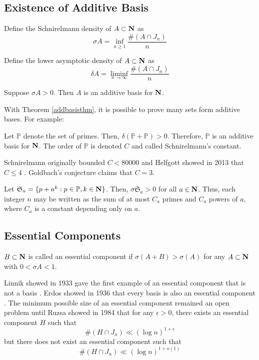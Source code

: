 \subsection{Existence of Additive Basis}

\begin{definition}
    Define the Schnirelmann density of $A\subset \mathbf{N}$ as
    $$\sigma A=\inf_{n\ge1}\frac{\#(A\cap J_n)}{n}$$
\end{definition}

\begin{definition}
    Define the lower asymptotic density of $A\subset \mathbf{N}$ as
    $$\delta A=\liminf_{n\to\infty}\frac{\#(A\cap J_n)}{n}$$
\end{definition}

\begin{theorem}
    Suppose $\sigma A>0$. Then $A$ is an additive basis for $\mathbf{N}$. \label{addbasisthm}
\end{theorem}

With Theorem \ref{addbasisthm}, it is possible to prove many sets form additive bases. For example:

\begin{theorem}
    Let $\mathbb P$ denote the set of primes. Then, $\delta(\mathbb P+\mathbb P)>0$. Therefore, $\mathbb P$ is an additive basis for $\mathbf{N}$. The order of $\mathbb P$ is denoted $C$ and called Schnirelmann's constant.
\end{theorem}

Schnirelmann originally bounded $C<80000$ and Helfgott showed in 2013 that $C\le4$ \cite{helfgott2015ternarygoldbachproblem}. Goldbach's conjecture claims that $C=3$.

\begin{theorem}
    Let $\mathfrak S_a=\{p+a^k:p\in\mathbb P, k\in\mathbf{N}\}$. Then, $\sigma\mathfrak S_a>0$ for all $a\in\mathbf{N}$. Thus, each integer $n$ may be written as the sum of at most $C_a$ primes and $C_a$ powers of $a$, where $C_a$ is a constant depending only on $a$.
\end{theorem}


\subsection{Essential Components}

\begin{definition}
    $B\subset \mathbf{N}$ is called an essential component if $\sigma(A+B)>\sigma(A)$ for any $A\subset\mathbf{N}$ with $0<\sigma A<1$.
\end{definition}

Linnik showed in 1933 gave the first example of an essential component that is not a basis \cite{zbMATH03105552}.
Erdos showed in 1936 that every basis is also an essential component \cite{Erdos1935}.
The minimum possible size of an essential component remained an open problem until Ruzsa showed in 1984\cite{Ruzsa_1987} that for any $\epsilon>0$, there exists an essential component $H$ such that
$$\#(H\cap J_n)\ll (\log n)^{1+\epsilon}$$ but there does not exist an essential component such that
$$\#(H\cap J_n)\ll(\log  n)^{1+o(1)}$$
